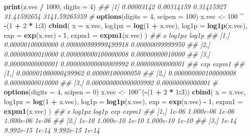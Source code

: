 \documentclass[
]{book}
\newenvironment{Shaded}{\begin{snugshade}}{\end{snugshade}}
\newcommand{\CommentTok}[1]{\textcolor[rgb]{0.56,0.35,0.01}{\textit{#1}}}
\newcommand{\DataTypeTok}[1]{\textcolor[rgb]{0.13,0.29,0.53}{#1}}
\newcommand{\DecValTok}[1]{\textcolor[rgb]{0.00,0.00,0.81}{#1}}
\newcommand{\KeywordTok}[1]{\textcolor[rgb]{0.13,0.29,0.53}{\textbf{#1}}}
\newcommand{\NormalTok}[1]{#1}
\newcommand{\OperatorTok}[1]{\textcolor[rgb]{0.81,0.36,0.00}{\textbf{#1}}}
\newcommand{\StringTok}[1]{\textcolor[rgb]{0.31,0.60,0.02}{#1}}
\begin{document}
\begin{Shaded}
\begin{Highlighting}[]
\KeywordTok{print}\NormalTok{(z.vec }\OperatorTok{/}\StringTok{ }\DecValTok{1000}\NormalTok{, }\DataTypeTok{digits =} \DecValTok{4}\NormalTok{)}
\CommentTok{\#\# [1]    0.00003142    0.00314159    0.31415927   31.41592654 3141.59265359}
\CommentTok{\#}
\KeywordTok{options}\NormalTok{(}\DataTypeTok{digits =} \DecValTok{4}\NormalTok{, }\DataTypeTok{scipen =} \DecValTok{100}\NormalTok{)}
\NormalTok{x.vec \textless{}{-}}\StringTok{ }\DecValTok{100} \OperatorTok{\^{}}\StringTok{ }\OperatorTok{{-}}\NormalTok{(}\DecValTok{1} \OperatorTok{+}\StringTok{ }\DecValTok{2} \OperatorTok{*}\StringTok{ }\DecValTok{1}\OperatorTok{:}\DecValTok{3}\NormalTok{)}
\KeywordTok{cbind}\NormalTok{(}
  \DataTypeTok{x =}\NormalTok{ x.vec,}
  \DataTypeTok{log1px =} \KeywordTok{log}\NormalTok{(}\DecValTok{1} \OperatorTok{+}\StringTok{ }\NormalTok{x.vec),}
  \DataTypeTok{log1p  =} \KeywordTok{log1p}\NormalTok{(x.vec),}
  \DataTypeTok{exp    =} \KeywordTok{exp}\NormalTok{(x.vec) }\OperatorTok{{-}}\StringTok{ }\DecValTok{1}\NormalTok{,}
  \DataTypeTok{expm1  =} \KeywordTok{expm1}\NormalTok{(x.vec)}
\NormalTok{)}
\CommentTok{\#\#                     x               log1px            log1p}
\CommentTok{\#\# [1,] 0.00000100000000 0.000000999999499918 0.00000099999950}
\CommentTok{\#\# [2,] 0.00000000010000 0.000000000100000008 0.00000000010000}
\CommentTok{\#\# [3,] 0.00000000000001 0.000000000000009992 0.00000000000001}
\CommentTok{\#\#                       exp            expm1}
\CommentTok{\#\# [1,] 0.000001000000499962 0.00000100000050}
\CommentTok{\#\# [2,] 0.000000000100000008 0.00000000010000}
\CommentTok{\#\# [3,] 0.000000000000009992 0.00000000000001}
\CommentTok{\#}
\KeywordTok{options}\NormalTok{(}\DataTypeTok{digits =} \DecValTok{4}\NormalTok{, }\DataTypeTok{scipen =} \DecValTok{0}\NormalTok{)}
\NormalTok{x.vec \textless{}{-}}\StringTok{ }\DecValTok{100}\OperatorTok{\^{}}\NormalTok{(}\OperatorTok{{-}}\NormalTok{(}\DecValTok{1} \OperatorTok{+}\StringTok{ }\DecValTok{2} \OperatorTok{*}\StringTok{ }\DecValTok{1}\OperatorTok{:}\DecValTok{3}\NormalTok{))}
\KeywordTok{cbind}\NormalTok{(}
  \DataTypeTok{x =}\NormalTok{ x.vec,}
  \DataTypeTok{log1px =} \KeywordTok{log}\NormalTok{(}\DecValTok{1} \OperatorTok{+}\StringTok{ }\NormalTok{x.vec),}
  \DataTypeTok{log1p  =} \KeywordTok{log1p}\NormalTok{(x.vec),}
  \DataTypeTok{exp    =} \KeywordTok{exp}\NormalTok{(x.vec) }\OperatorTok{{-}}\StringTok{ }\DecValTok{1}\NormalTok{,}
  \DataTypeTok{expm1  =} \KeywordTok{expm1}\NormalTok{(x.vec)}
\NormalTok{)}
\CommentTok{\#\#          x    log1px log1p       exp expm1}
\CommentTok{\#\# [1,] 1e{-}06 1.000e{-}06 1e{-}06 1.000e{-}06 1e{-}06}
\CommentTok{\#\# [2,] 1e{-}10 1.000e{-}10 1e{-}10 1.000e{-}10 1e{-}10}
\CommentTok{\#\# [3,] 1e{-}14 9.992e{-}15 1e{-}14 9.992e{-}15 1e{-}14}
\end{Highlighting}
\end{Shaded}
\end{document}
